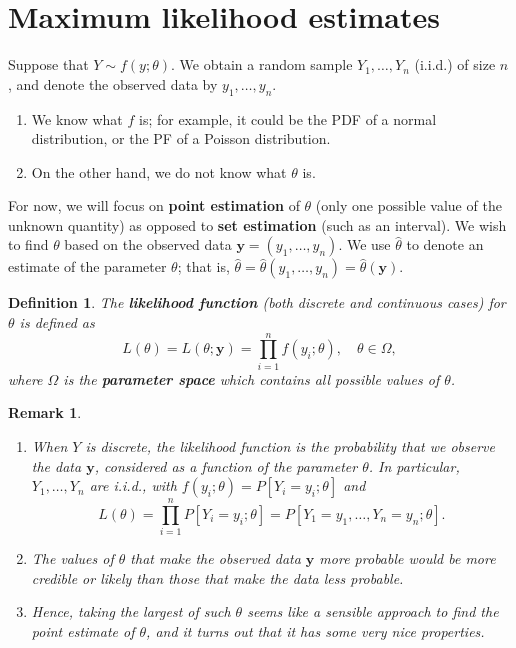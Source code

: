 \documentclass[10pt]{article}
\theoremstyle{newstyle}
\newtheorem{remark}[thm]{Remark}
\newtheorem{defn}[thm]{Definition}
\begin{document}
\newpage 
\section{Maximum likelihood estimates}

Suppose that $Y \sim f(y; \theta)$. We obtain a random sample $Y_1, 
\dots, Y_n$ (i.i.d.) of size $n$, and denote the observed data by $y_1, \dots, y_n$. 
\begin{enumerate}[(1)]
    \item We know what $f$ is; for example, it could be the PDF of a normal distribution, 
    or the PF of a Poisson distribution.
    \item On the other hand, we do not know what $\theta$ is.
\end{enumerate}
For now, we will focus on {\bf point estimation} of $\theta$ (only one possible 
value of the unknown quantity) as opposed to {\bf set estimation} (such as an interval).
We wish to find $\theta$ based on the observed data $\mathbf{y} = (y_1, \dots, y_n)$. 
We use $\hat\theta$ to denote an estimate of the parameter $\theta$; that is, 
$\hat\theta = \hat\theta(y_1, \dots, y_n) = \hat\theta(\mathbf{y})$.

\begin{defn}
The {\bf likelihood function} (both discrete and continuous cases) for $\theta$ is defined as 
\[ L(\theta) = L(\theta; \mathbf{y}) = \prod_{i=1}^n f(y_i; \theta), \quad \theta \in \Omega, \]
where $\Omega$ is the {\bf parameter space} which contains all possible values of $\theta$. 
\end{defn}

\begin{remark}~
\begin{enumerate}[(1)]
    \item When $Y$ is {\it discrete}, the likelihood function is the probability that we 
    observe the data $\mathbf{y}$, considered as a function of the parameter $\theta$. 
    In particular, $Y_1, \dots, Y_n$ are i.i.d., with $f(y_i; \theta) 
    = P[Y_i = y_i; \theta]$ and 
    \[ L(\theta) = \prod_{i=1}^n P[Y_i = y_i; \theta] = P[Y_1 = y_1, \dots, Y_n = y_n; \theta]. \]
    \item The values of $\theta$ that make the observed data $\mathbf{y}$ more probable 
    would be more credible or likely than those that make the data less probable. 
    \item Hence, taking the largest of such $\theta$ seems like a sensible approach to find the 
    point estimate of $\theta$, and it turns out that it has some very nice properties. 
\end{enumerate}
\end{remark}
\end{document}
